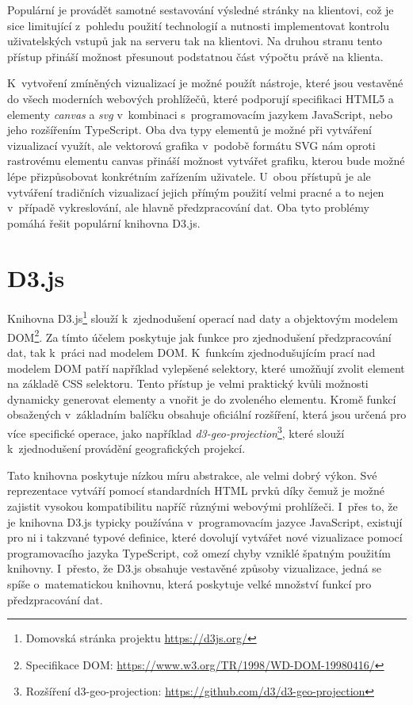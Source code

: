 Populární je provádět samotné sestavování výsledné stránky na klientovi, což je sice limitující z~pohledu použití technologií a nutnosti implementovat kontrolu uživatelských vstupů jak na serveru tak na klientovi. Na druhou stranu tento přístup přináší možnost přesunout podstatnou část výpočtu právě na klienta.

K~vytvoření zmíněných vizualizací je možné použít nástroje, které jsou vestavěné do všech moderních webových prohlížečů, které podporují specifikaci HTML5 a elementy \textit{canvas} a \textit{svg} v~kombinaci s~programovacím jazykem JavaScript, nebo jeho rozšířením TypeScript. Oba dva typy elementů je možné při vytváření vizualizací využít, ale vektorová grafika v~podobě formátu SVG nám oproti rastrovému elementu canvas přináší možnost vytvářet grafiku, kterou bude možné lépe přizpůsobovat konkrétním zařízením uživatele. U~obou přístupů je ale vytváření tradičních vizualizací jejich přímým použití velmi pracné a to nejen v~případě vykreslování, ale hlavně předzpracování dat. Oba tyto problémy pomáhá řešit populární knihovna D3.js.

\section{D3.js}
Knihovna D3.js\footnote{Domovská stránka projektu \url{https://d3js.org/}} slouží k~zjednodušení operací nad daty a objektovým modelem DOM\footnote{Specifikace DOM: \url{https://www.w3.org/TR/1998/WD-DOM-19980416/}}. Za tímto účelem poskytuje jak funkce pro zjednodušení předzpracování dat, tak k~práci nad modelem DOM. K~funkcím zjednodušujícím prací nad modelem DOM patří například vylepšené selektory, které umožňují zvolit element na základě CSS selektoru. Tento přístup je velmi praktický kvůli možnosti dynamicky generovat elementy a vnořit je do zvoleného elementu. Kromě funkcí obsažených v~základním balíčku obsahuje oficiální rozšíření, která jsou určená pro více specifické operace, jako například \textit{d3-geo-projection}\footnote{Rozšíření d3-geo-projection: \url{https://github.com/d3/d3-geo-projection}}, které slouží k~zjednodušení provádění geografických projekcí.

Tato knihovna poskytuje nízkou míru abstrakce, ale velmi dobrý výkon. Své reprezentace vytváří pomocí standardních HTML prvků díky čemuž je možné zajistit vysokou kompatibilitu napříč různými webovými prohlížeči. I~přes to, že je knihovna D3.js typicky používána v~programovacím jazyce JavaScript, existují pro ni i takzvané typové definice, které dovolují vytvářet nové vizualizace pomocí programovacího jazyka TypeScript, což omezí chyby vzniklé špatným použitím knihovny. I~přesto, že D3.js obsahuje vestavěné způsoby vizualizace, jedná se spíše o~matematickou knihovnu, která poskytuje velké množství funkcí pro předzpracování dat.

